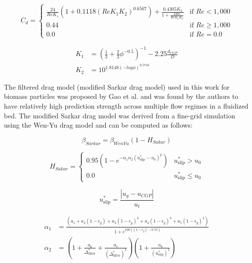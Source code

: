 \documentclass{article}
\begin{document}
\begin{equation}
    C_d =
    \begin{cases}
        \frac{24}{Re K_1} (1 + 0.1118(Re K_1 K_2)^{0.6567}) + \frac{0.4305 K_2}{1 + \frac{3305}{Re K_1 K_2}} & \text{if } Re < 1,000 \\
        0.44 & \text{if } Re \geq 1,000 \\
        0.0 & \text{if } Re = 0.0
    \end{cases}
\end{equation}

\begin{align}
    K_1 &= \left(\frac{1}{3} + \frac{2}{3} \phi^{-0.5} \right)^{-1} - 2.25 \frac{d_{CGP}}{D} \\
    K_2 &= 10^{1.8148 (-log \phi)^{0.5743}}
\end{align}

The filtered drag model (modified Sarkar drag model) used in this work for biomass particles was proposed by Gao et al. \cite{Gao-2018} and was found by the authors to have relatively high prediction strength across multiple flow regimes in a fluidized bed. The modified Sarkar drag model was derived from a fine-grid simulation using the Wen-Yu drag model and can be computed as follows:

\begin{equation}
    \beta_{Sarkar} = \beta_{WenYu} (1 - H_{Sakar})
\end{equation}

\begin{equation}
    H_{Sakar} =
    \begin{cases}
        0.95 \left(1 - e^{-\alpha_1 \alpha_2 (u_{\text{slip}}^* - u_0)^p} \right) & u_{\text{slip}}^* > u_0 \\
        0.0 & u_{\text{slip}}^* \leq u_0
    \end{cases}
\end{equation}

\begin{equation}
    u_{\text{slip}}^* = \frac{|u_g - u_{CGP}|}{u_t}
\end{equation}

\begin{align}
    \alpha_1 &= \frac{\left(a_1 + a_2(1 - \epsilon_g) + a_3(1 - \epsilon_g)^2 + a_4(1 - \epsilon_g)^3 + a_5(1 - \epsilon_g)^4 \right)}{1 + e^{100 \left((1 - \epsilon_g) - 0.55 \right)}} \\
    \alpha_2 &= \left(1 + \frac{a_6}{\Delta_{\text{filter}}^*} + \frac{a_7}{(\Delta_{\text{filter}}^*)^2} \right) \left(1 + \frac{a_8}{(u_{\text{slip}}^*)^2} \right)
\end{align}
\end{document}
